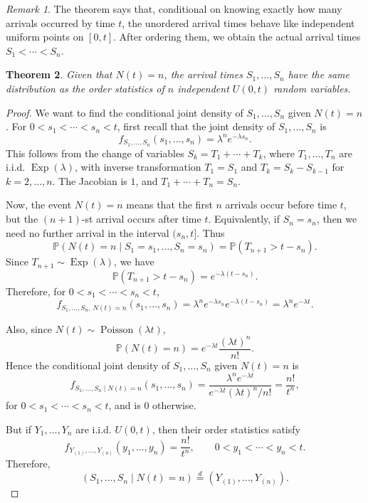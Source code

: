 \documentclass[11pt]{article}
\theoremstyle{plain}
\newtheorem{theorem}{Theorem}[section]
\theoremstyle{definition}
\theoremstyle{remark}
\newtheorem{remark}[theorem]{Remark}
\begin{document}
	
	\begin{remark}
		The theorem says that, conditional on knowing exactly how many arrivals occurred by time \(t\), the unordered arrival times behave like independent uniform points on \([0,t]\). After ordering them, we obtain the actual arrival times \(S_1<\cdots<S_n\).
	\end{remark}
	
	
	\begin{theorem}
		Given that \(N(t)=n\), the arrival times \(S_1,\dots,S_n\) have the same distribution as the order statistics of \(n\) independent \(U(0,t)\) random variables.
	\end{theorem}
	
	\begin{proof}
		We want to find the conditional joint density of \(S_1,\dots,S_n\) given \(N(t)=n\). For \(0<s_1<\cdots<s_n<t\), first recall that the joint density of \(S_1,\dots,S_n\) is
		\[
		f_{S_1,\dots,S_n}(s_1,\dots,s_n)
		=
		\lambda^n e^{-\lambda s_n}.
		\]
		This follows from the change of variables \(S_k=T_1+\cdots+T_k\), where \(T_1,\dots,T_n\) are i.i.d. \(\operatorname{Exp}(\lambda)\), with inverse transformation \(T_1=S_1\) and \(T_k=S_k-S_{k-1}\) for \(k=2,\dots,n\). The Jacobian is \(1\), and \(T_1+\cdots+T_n=S_n\).
		
		Now, the event \(N(t)=n\) means that the first \(n\) arrivals occur before time \(t\), but the \((n+1)\)-st arrival occurs after time \(t\). Equivalently, if \(S_n=s_n\), then we need no further arrival in the interval \((s_n,t]\). Thus
		\[
		\mathbb{P}(N(t)=n\mid S_1=s_1,\dots,S_n=s_n)
		=
		\mathbb{P}(T_{n+1}>t-s_n).
		\]
		Since \(T_{n+1}\sim \operatorname{Exp}(\lambda)\), we have
		\[
		\mathbb{P}(T_{n+1}>t-s_n)
		=
		e^{-\lambda(t-s_n)}.
		\]
		Therefore, for \(0<s_1<\cdots<s_n<t\),
		\[
		f_{S_1,\dots,S_n,\,N(t)=n}(s_1,\dots,s_n)
		=
		\lambda^n e^{-\lambda s_n}e^{-\lambda(t-s_n)}
		=
		\lambda^n e^{-\lambda t}.
		\]
		
		Also, since \(N(t)\sim \operatorname{Poisson}(\lambda t)\),
		\[
		\mathbb{P}(N(t)=n)
		=
		e^{-\lambda t}\frac{(\lambda t)^n}{n!}.
		\]
		Hence the conditional joint density of \(S_1,\dots,S_n\) given \(N(t)=n\) is
		\[
		f_{S_1,\dots,S_n\mid N(t)=n}(s_1,\dots,s_n)
		=
		\frac{\lambda^n e^{-\lambda t}}
		{e^{-\lambda t}(\lambda t)^n/n!}
		=
		\frac{n!}{t^n},
		\]
		for \(0<s_1<\cdots<s_n<t\), and is \(0\) otherwise.
		
		But if \(Y_1,\dots,Y_n\) are i.i.d. \(U(0,t)\), then their order statistics satisfy
		\[
		f_{Y_{(1)},\dots,Y_{(n)}}(y_1,\dots,y_n)
		=
		\frac{n!}{t^n},
		\qquad 0<y_1<\cdots<y_n<t.
		\]
		Therefore,
		\[
		(S_1,\dots,S_n\mid N(t)=n)
		\overset{d}{=}
		(Y_{(1)},\dots,Y_{(n)}).
		\]
	\end{proof}
	
\end{document}
